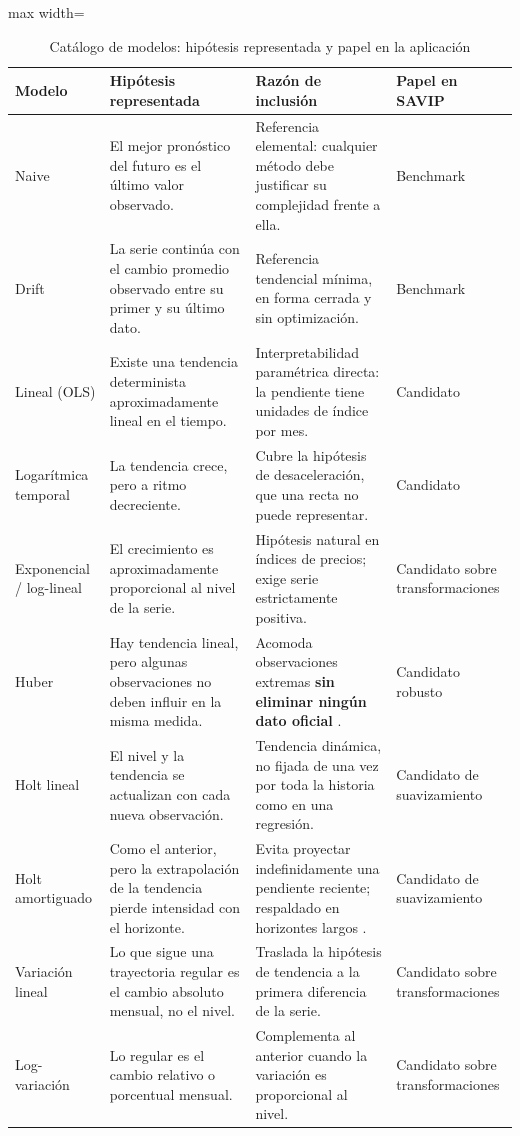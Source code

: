 \documentclass[12pt,letterpaper]{article}
\providecommand{\parencite}{\citep}
\begin{document}
\begin{table}[H]
\centering
\caption{Catálogo de modelos: hipótesis representada y papel en la aplicación}
\label{tab:catalogo_hipotesis}
\vspace{\baselineskip}
\scriptsize
\begin{adjustbox}{max width=\textwidth}
\begin{tabular}{>{\raggedright\arraybackslash}p{}>{\raggedright\arraybackslash}p{}>{\raggedright\arraybackslash}p{}>{\raggedright\arraybackslash}p{}}
\toprule
\textbf{Modelo} & \textbf{Hipótesis representada} & \textbf{Razón de inclusión} & \textbf{Papel en SAVIP} \\
\midrule
Naive & El mejor pronóstico del futuro es el último valor observado. & Referencia elemental: cualquier método debe justificar su complejidad frente a ella. & Benchmark \\
Drift & La serie continúa con el cambio promedio observado entre su primer y su último dato. & Referencia tendencial mínima, en forma cerrada y sin optimización. & Benchmark \\
Lineal (OLS) & Existe una tendencia determinista aproximadamente lineal en el tiempo. & Interpretabilidad paramétrica directa: la pendiente tiene unidades de índice por mes. & Candidato \\
Logarítmica temporal & La tendencia crece, pero a ritmo decreciente. & Cubre la hipótesis de desaceleración, que una recta no puede representar. & Candidato \\
Exponencial / log-lineal & El crecimiento es aproximadamente proporcional al nivel de la serie. & Hipótesis natural en índices de precios; exige serie estrictamente positiva. & Candidato sobre transformaciones \\
Huber & Hay tendencia lineal, pero algunas observaciones no deben influir en la misma medida. & Acomoda observaciones extremas \textbf{sin eliminar ningún dato oficial} \parencite{huber1964}. & Candidato robusto \\
Holt lineal & El nivel y la tendencia se actualizan con cada nueva observación. & Tendencia dinámica, no fijada de una vez por toda la historia como en una regresión. & Candidato de suavizamiento \\
Holt amortiguado & Como el anterior, pero la extrapolación de la tendencia pierde intensidad con el horizonte. & Evita proyectar indefinidamente una pendiente reciente; respaldado en horizontes largos \parencite{gardner_mckenzie1985,gardner2006}. & Candidato de suavizamiento \\
Variación lineal & Lo que sigue una trayectoria regular es el cambio absoluto mensual, no el nivel. & Traslada la hipótesis de tendencia a la primera diferencia de la serie. & Candidato sobre transformaciones \\
Log-variación & Lo regular es el cambio relativo o porcentual mensual. & Complementa al anterior cuando la variación es proporcional al nivel. & Candidato sobre transformaciones \\
\bottomrule
\end{tabular}
\end{adjustbox}
\end{table}
\end{document}
